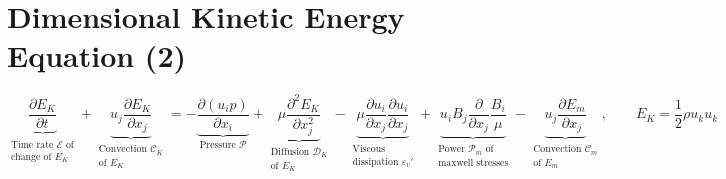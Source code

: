 \documentclass[11pt]{article}
\newcommand{\PD}{\partial}
\newcommand{\MC}{\mathcal}
\begin{document}
\section{Dimensional Kinetic Energy Equation (2)}
\begin{equation}
	\boxed{
	\underbrace{\frac{\PD E_K}{\PD t}}_{\substack{\text{Time rate $\dot{\MC E}$ of} \\ \text{change of $E_K$}}} + 
	\underbrace{u_j \frac{\PD E_K}{\PD x_j}}_
	{\substack{\text{Convection } \MC C_K \\\text{of $E_K$}}}
	= 
	- \underbrace{\frac{\PD (u_i p)}{\PD x_i}}_{\text{Pressure } \MC P} 
	+ \underbrace{ \mu \frac{\PD^2 E_K}{\PD x_j^2} }_{\substack{\text{Diffusion } \MC D_K \\ \text{of $E_K$ }}}
	- \underbrace{\mu \frac{\PD u_i}{\PD x_j}\frac{\PD u_i}{\PD x_j} }_{\substack{\text{Viscous } \\ \text{dissipation } \varepsilon_v'}}
	+ \underbrace{u_i B_j \frac{\PD}{\PD x_j} \frac{B_i}{\mu}}_
	{\substack{\text{Power $\MC P_{m}$ of}\\\text{maxwell stresses}}}
	- \underbrace{u_j \frac{\PD E_m}{\PD x_j}}_
	{\substack{\text{Convection $\MC C_m$}\\\text{of $E_m$}}}
	, \qquad
	E_K = \frac{1}{2} \rho u_k u_k
	}
\end{equation}
\end{document}

